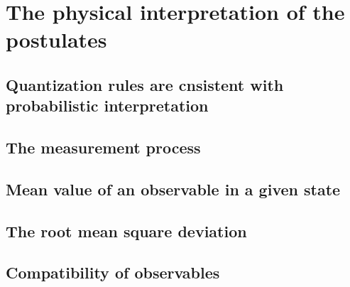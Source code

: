 \section{The physical interpretation of the postulates}

\subsection{Quantization rules are cnsistent with probabilistic interpretation}


\subsection{The measurement process}


\subsection{Mean value of an observable in a given state}


\subsection{The root mean square deviation}



\subsection{Compatibility of observables}